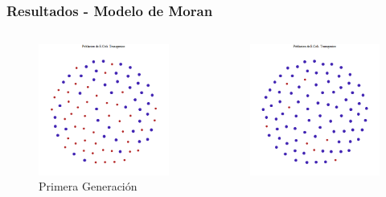 \documentclass{beamer}
\begin{document}


\begin{frame}
\frametitle{Resultados - Modelo de Moran}
\begin{columns}[c] %
\begin{figure}[ht!]
\vspace*{-1cm}
\includegraphics[scale=0.16]{ecoli_moran_1.png} 
\caption{Primera Generación}
\end{figure} 
\begin{figure}[ht!]
\vspace*{-1cm}
\includegraphics[scale=0.16]{ecoli_moran_339.png} 

\end{figure}
\end{columns}
\end{frame}
\end{document}
